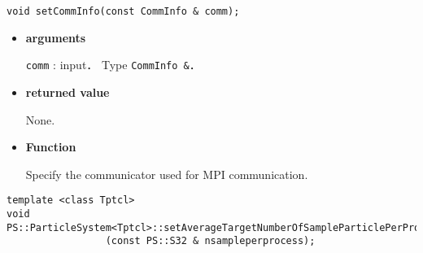 
\begin{screen}
\begin{verbatim}
void setCommInfo(const CommInfo & comm);
\end{verbatim}
\end{screen}

\begin{itemize}

\item {\bf arguments}

{\tt comm} : input． Type {\tt CommInfo \&}．

\item {\bf returned value}

None.

\item {\bf Function}

Specify the communicator used for MPI communication.







\end{itemize}



\begin{screen}
\begin{verbatim}
template <class Tptcl>
void PS::ParticleSystem<Tptcl>::setAverageTargetNumberOfSampleParticlePerProcess
                 (const PS::S32 & nsampleperprocess);
\end{verbatim}
\end{screen}

